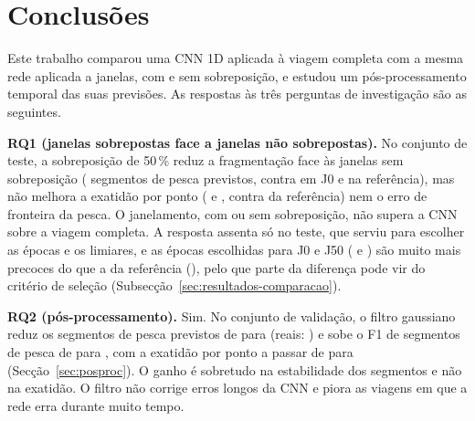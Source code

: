 \documentclass{article}
\newcommand{\revtext}[2]{{\color{#1}#2}}
\begin{document}
\section{\texorpdfstring{\revtext{rev060}{Conclusões}}{Conclusões}}
\label{sec:conclusoes}

\revtext{rev060}{Este trabalho comparou uma CNN 1D aplicada à viagem completa com a mesma rede aplicada a janelas, com e sem sobreposição, e estudou um pós-processamento temporal das suas previsões. As respostas às três perguntas de investigação são as seguintes.

\textbf{RQ1 (janelas sobrepostas face a janelas não sobrepostas).} No conjunto de teste, a sobreposição de 50\,\% reduz a fragmentação face às janelas sem sobreposição (\resJCSegPescaNPred{} segmentos de pesca previstos, contra \resJZSegPescaNPred{} em J0 e \resBsSegPescaNPred{} na referência), mas não melhora a exatidão por ponto (\resJCTesteAcc{} e \resJZTesteAcc{}, contra \resBsTesteAcc{} da referência) nem o erro de fronteira da pesca. O janelamento, com ou sem sobreposição, não supera a CNN sobre a viagem completa. A resposta assenta só no teste, que serviu para escolher as épocas e os limiares, e as épocas escolhidas para J0 e J50 (\resJZEpoca{} e \resJCEpoca{}) são muito mais precoces do que a da referência (\resBsEpoca{}), pelo que parte da diferença pode vir do critério de seleção (Subsecção~\ref{sec:resultados-comparacao}).

\textbf{RQ2 (pós-processamento).} Sim. No conjunto de validação, o filtro gaussiano reduz os segmentos de pesca previstos de \resPpASegPescaNPred{} para \resPpDSegPescaNPred{} (reais: \resPpASegPescaNRef{}) e sobe o F1 de segmentos de pesca de \resPpASegPescaF{} para \resPpDSegPescaF{}, com a exatidão por ponto a passar de \resPpAntesAcc{} para \resPpDepoisAcc{} (Secção~\ref{sec:posproc}). O ganho é sobretudo na estabilidade dos segmentos e não na exatidão. O filtro não corrige erros longos da CNN e piora as viagens em que a rede erra durante muito tempo.

}
\end{document}
